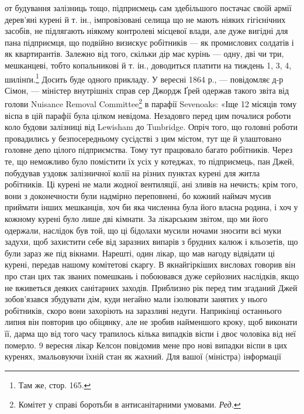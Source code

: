 \parcont{}  %
от будування залізниць тощо, підприємець сам здебільшого постачає
своїй армії дерев’яні курені й т. ін., імпровізовані селища
що не мають ніяких гігієнічних засобів, не підлягають ніякому
контролеві місцевої влади, але дуже вигідні для пана підприємця,
що подвійно визискує робітників — як промислових солдатів
і як квартирантів. Залежно від того, скільки дір має курінь —
одну, дві чи три, мешканцеві, тобто копальникові й т. ін., доводиться
платити на тиждень 1, 3, 4, шилінґи.\footnote{
Там же, стор. 165.
} Досить буде одного
прикладу. У вересні 1864 р., — повідомляє д-р Сімон, — міністер
внутрішніх справ сер Джордж Ґрей одержав такого звіта
від голови Nuisance Removal Committee\footnote*{
Комітет у справі боротьби в антисанітарними умовами. \emph{Ред.}
} в парафії Sevenoaks:
«Іще 12 місяців тому віспа в цій парафії була цілком невідома.
Незадовго перед цим почалися роботи коло будови залізниці
від Lewisham до Tunbridge. Опріч того, що головні роботи провадились
у безпосередньому сусідстві з цим містом, тут ще й
улаштовано головне депо цілого підприємства. Тому тут працювало
багато робітників. Через те, що неможливо було помістити
їх усіх у котеджах, то підприємець, пан Джей, побудував уздовж
залізничної колії на різних пунктах курені для житла робітників.
Ці курені не мали жодної вентиляції, ані зливів на нечисть;
крім того, вони з доконечности були надмірно переповнені,
бо кожний наймач мусив приймати інших мешканців, хоч би
яка численна була його власна родина, і хоч у кожному курені
було лише дві кімнати. За лікарським звітом, що ми його одержали,
наслідок був той, що ці бідолахи мусили ночами зносити
всі муки задухи, щоб захистити себе від заразних випарів з брудних
калюж і кльозетів, що були зараз же під вікнами. Нарешті,
один лікар, що мав нагоду відвідати ці курені, передав нашому
комітетові скаргу. В якнайгіркіших висловах говорив він про
стан цих так званих помешкань і побоювався дуже серйозних
наслідків, якщо не вживеться деяких санітарних заходів. Приблизно
рік перед тим згаданий Джей зобов’язався збудувати дім,
куди негайно мали ізолювати занятих у нього робітників, скоро
вони захоріють на заразливі недуги. Наприкінці останнього
липня він повторив цю обіцянку, але не зробив найменшого
кроку, щоб виконати її, дарма що від того часу трапилось кілька
випадків віспи і двоє чоловіка від неї померло. 9 вересня лікар
Келсон повідомив мене про нові випадки віспи в цих куренях,
змальовуючи їхній стан як жахний. Для вашої (міністра) інформації
